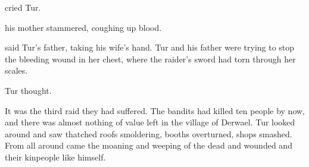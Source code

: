 




\begin{comment}
  \section{Village}
\end{comment}
 cried Tur. 

 his mother stammered, coughing up blood. 

 said Tur's father, taking his wife's hand.
Tur and his father were trying to stop the bleeding wound in her chest, where the raider's sword had torn through her scales. 

 Tur thought. 

It was the third raid they had suffered. 
The bandits had killed ten people by now, and there was almost nothing of value left in the village of Derwael. 
Tur looked around and saw thatched roofs smoldering, booths overturned, shops smashed. 
From all around came the moaning and weeping of the dead and wounded and their kin\dash people like himself. 

